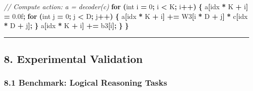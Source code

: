 \documentclass[
  11pt,
  a4paper,
]{article}
\newenvironment{Shaded}{\begin{snugshade}}{\end{snugshade}}
\newcommand{\BuiltInTok}[1]{#1}
\newcommand{\CommentTok}[1]{\textcolor[rgb]{0.56,0.35,0.01}{\textit{#1}}}
\newcommand{\ControlFlowTok}[1]{\textcolor[rgb]{0.13,0.29,0.53}{\textbf{#1}}}
\newcommand{\DataTypeTok}[1]{\textcolor[rgb]{0.13,0.29,0.53}{#1}}
\newcommand{\DecValTok}[1]{\textcolor[rgb]{0.00,0.00,0.81}{#1}}
\newcommand{\FloatTok}[1]{\textcolor[rgb]{0.00,0.00,0.81}{#1}}
\newcommand{\NormalTok}[1]{#1}
\newcommand{\OperatorTok}[1]{\textcolor[rgb]{0.81,0.36,0.00}{\textbf{#1}}}
\begin{document}
\begin{Shaded}
\begin{Highlighting}[]
    \CommentTok{// Compute action: a = decoder(c)}
    \ControlFlowTok{for} \OperatorTok{(}\DataTypeTok{int}\NormalTok{ i }\OperatorTok{=} \DecValTok{0}\OperatorTok{;}\NormalTok{ i }\OperatorTok{\textless{}}\NormalTok{ K}\OperatorTok{;}\NormalTok{ i}\OperatorTok{++)} \OperatorTok{\{}
\NormalTok{        a}\OperatorTok{[}\NormalTok{idx }\OperatorTok{*}\NormalTok{ K }\OperatorTok{+}\NormalTok{ i}\OperatorTok{]} \OperatorTok{=} \FloatTok{0.0}\BuiltInTok{f}\OperatorTok{;}
        \ControlFlowTok{for} \OperatorTok{(}\DataTypeTok{int}\NormalTok{ j }\OperatorTok{=} \DecValTok{0}\OperatorTok{;}\NormalTok{ j }\OperatorTok{\textless{}}\NormalTok{ D}\OperatorTok{;}\NormalTok{ j}\OperatorTok{++)} \OperatorTok{\{}
\NormalTok{            a}\OperatorTok{[}\NormalTok{idx }\OperatorTok{*}\NormalTok{ K }\OperatorTok{+}\NormalTok{ i}\OperatorTok{]} \OperatorTok{+=}\NormalTok{ W3}\OperatorTok{[}\NormalTok{i }\OperatorTok{*}\NormalTok{ D }\OperatorTok{+}\NormalTok{ j}\OperatorTok{]} \OperatorTok{*}\NormalTok{ c}\OperatorTok{[}\NormalTok{idx }\OperatorTok{*}\NormalTok{ D }\OperatorTok{+}\NormalTok{ j}\OperatorTok{];}
        \OperatorTok{\}}
\NormalTok{        a}\OperatorTok{[}\NormalTok{idx }\OperatorTok{*}\NormalTok{ K }\OperatorTok{+}\NormalTok{ i}\OperatorTok{]} \OperatorTok{+=}\NormalTok{ b3}\OperatorTok{[}\NormalTok{i}\OperatorTok{];}
    \OperatorTok{\}}
\OperatorTok{\}}
\end{Highlighting}
\end{Shaded}

\begin{center}\rule{0.5\linewidth}{0.5pt}\end{center}

\subsection{8. Experimental Validation}\label{experimental-validation}

\subsubsection{8.1 Benchmark: Logical Reasoning
Tasks}\label{benchmark-logical-reasoning-tasks}
\end{document}
